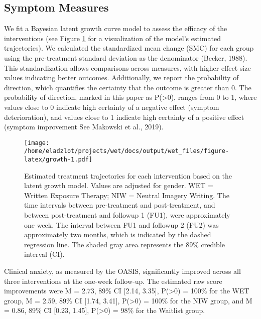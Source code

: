 \documentclass[
  man,floatsintext]{apa7}
\begin{document}
\subsection{Symptom Measures}\label{symptom-measures}

We fit a Bayesian latent growth curve model to assess the efficacy of the interventions (see Figure \ref{fig:growth} for a visualization of the model's estimated trajectories).
We calculated the standardized mean change (SMC) for each group using the pre-treatment standard deviation as the denominator (Becker, 1988).
This standardization allows comparisons across measures, with higher effect size values indicating better outcomes.
Additionally, we report the probability of direction, which quantifies the certainty that the outcome is greater than 0.
The probability of direction, marked in this paper as P(\textgreater0), ranges from 0 to 1, where values close to 0 indicate high certainty of a negative effect (symptom deterioration), and values close to 1 indicate high certainty of a positive effect (symptom improvement See Makowski et al., 2019).



\begin{figure}
\centering
\texttt{[image: /home/eladzlot/projects/wet/docs/output/wet\_files/figure-latex/growth-1.pdf]}
\caption{\label{fig:growth}Estimated treatment trajectories for each intervention based on the latent growth model. Values are adjusted for gender. WET = Written Exposure Therapy; NIW = Neutral Imagery Writing. The time intervals between pre-treatment and post-treatment, and between post-treatment and followup 1 (FU1), were approximately one week. The interval between FU1 and followup 2 (FU2) was approximately two months, which is indicated by the dashed regression line. The shaded gray area represents the 89\% credible interval (CI).}
\end{figure}

Clinical anxiety, as measured by the OASIS, significantly improved across all three interventions at the one-week follow-up.
The estimated raw score improvements were M = 2.73, 89\% CI {[}2.14, 3.35{]}, P(\textgreater0) = 100\% for the WET group, M = 2.59, 89\% CI {[}1.74, 3.41{]}, P(\textgreater0) = 100\% for the NIW group, and M = 0.86, 89\% CI {[}0.23, 1.45{]}, P(\textgreater0) = 98\% for the Waitlist group.
\end{document}
